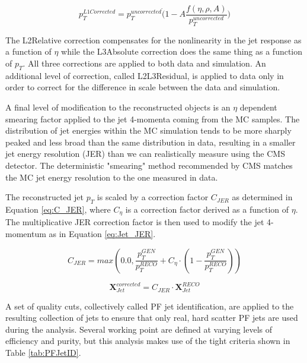 \begin{equation}
\label{pileupeq}
p_{T}^{L1Corrected} = p_{T}^{uncorrected}\dot(1 - A\frac{f(\eta,\rho,A)}{p_{T}^{uncorrected}})
\end{equation}

The L2Relative correction compensates for the nonlinearity in the jet response as a function of $\eta$ while the L3Absolute correction does the same thing as a function of $p_{T}$. All three corrections are applied to both data and simulation. An additional level of correction, called L2L3Residual, is applied to data only in order to correct for the difference in scale between the data and simulation.

A final level of modification to the reconstructed objects is an $\eta$ dependent smearing factor applied to the jet 4-momenta coming from the MC samples. The distribution of jet energies within the MC simulation tends to be more sharply peaked and less broad than the same distribution in data, resulting in a smaller jet energy resolution (JER) than we can realistically measure using the CMS detector. The deterministic "smearing" method recommended by CMS\cite{JetEnergyResolutionTwiki} matches the MC jet energy resolution to the one measured in data. 

The reconstructed jet $p_{T}$ is scaled by a correction factor $C_{JER}$ as determined in Equation \ref{eq:C_JER}, where $C_{\eta}$ is a correction factor derived as a function of $\eta$. The multiplicative JER correction factor is then used to modify the jet 4-momentum as in Equation \ref{eq:Jet_JER}.

\begin{equation}
\label{eq:C_JER}
C_{JER}=max\left(0.0,\frac{p_{T}^{GEN}}{p_{T}^{RECO}}+C_{\eta}\cdot\left(1-\frac{p_{T}^{GEN}}{p_{T}^{RECO}}\right)\right)
\end{equation}

\begin{equation}
\label{eq:Jet_JER}
\textbf{X}_{Jet}^{corrected}=C_{JER}{\cdot}\textbf{X}_{Jet}^{RECO}
\end{equation}

A set of quality cuts, collectively called PF jet identification, are applied to the resulting collection of jets to ensure that only real, hard scatter PF jets are used during the analysis\cite{CMS-AN-2010-003}. Several working point are defined at varying levels of efficiency and purity, but this analysis makes use of the tight criteria shown in Table \ref{tab:PFJetID}\cite{PFJetID}.

